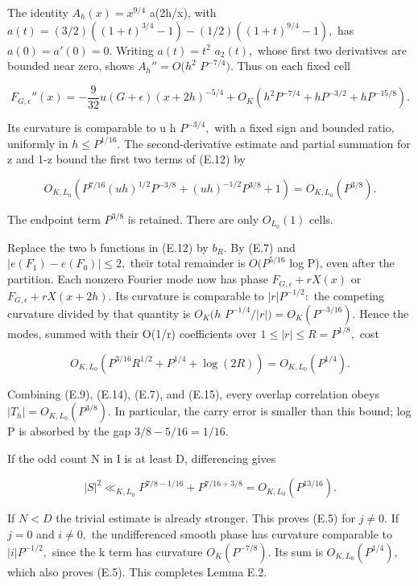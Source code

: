 \documentclass[11pt,a4paper]{article}
\begin{document}
The identity \(A_h(x)=x^{9/4}\) a(2h/x), with
\(a(t)=(3/2)((1+t)^{3/4}-1)-(1/2)((1+t)^{9/4}-1),\) has
\(a(0)=a'(0)=0.\) Writing \(a(t)=t^2\) \(a_2(t),\) whose first two
derivatives are bounded near zero, shows \(A_h''=O(h^2\) \(P^{-7/4}).\)
Thus on each fixed cell

\[
 F_{G,\epsilon}''(x)=-\frac9{32}u(G+\epsilon)(x+2h)^{-5/4}
     +O_K(h^2P^{-7/4}+hP^{-3/2}+hP^{-15/8}).
 \tag{E.13}
\]

Its curvature is comparable to u h \(P^{-3/4},\) with a fixed sign and
bounded ratio, uniformly in \(h\le P^{1/16}.\) The second-derivative
estimate and partial summation for z and 1-z bound the first two terms
of (E.12) by

\[
 O_{K,L_0}\left(P^{7/16}(uh)^{1/2}P^{-3/8}
                         +(uh)^{-1/2}P^{3/8}+1\right)
       =O_{K,L_0}(P^{3/8}).
 \tag{E.14}
\]

The endpoint term \(P^{3/8}\) is retained. There are only \(O_{L_0}(1)\)
cells.

Replace the two b functions in (E.12) by \(b_R.\) By (E.7) and
\(|e(F_1)-e(F_0)|\le 2,\) their total remainder is \(O(P^{5/16}\) log
P), even after the partition. Each nonzero Fourier mode now has phase
\(F_{G,\epsilon}+rX(x)\) or \(F_{G,\epsilon}+rX(x+2h).\) Its curvature
is comparable to \(|r|P^{-1/2}:\) the competing curvature divided by
that quantity is \(O_K(h\) \(P^{-1/4}/|r|)=O_K(P^{-3/16}).\) Hence the
modes, summed with their O(1/\textbar r\textbar) coefficients over
\(1\le |r|\le R=P^{1/8},\) cost

\[
 O_{K,L_0}\left(P^{3/16}R^{1/2}+P^{1/4}+\log(2R)\right)
                 =O_{K,L_0}(P^{1/4}).
 \tag{E.15}
\]

Combining (E.9), (E.14), (E.7), and (E.15), every overlap correlation
obeys \(|T_h|=O_{K,L_0}(P^{3/8}).\) In particular, the carry error is
smaller than this bound; log P is absorbed by the gap \(3/8-5/16=1/16.\)

If the odd count N in I is at least D, differencing gives

\[
 |S|^2\ll_{K,L_0} P^{7/8-1/16}+P^{7/16+3/8}
                     =O_{K,L_0}(P^{13/16}).
 \tag{E.16}
\]

If \(N<D\) the trivial estimate is already stronger. This proves (E.5)
for \(j\ne 0.\) If \(j=0\) and \(i\ne 0,\) the undifferenced smooth
phase has curvature comparable to \(|i|P^{-1/2},\) since the k term has
curvature \(O_K(P^{-7/8}).\) Its sum is \(O_{K,L_0}(P^{1/4}),\) which
also proves (E.5). This completes Lemma E.2.
\end{document}
